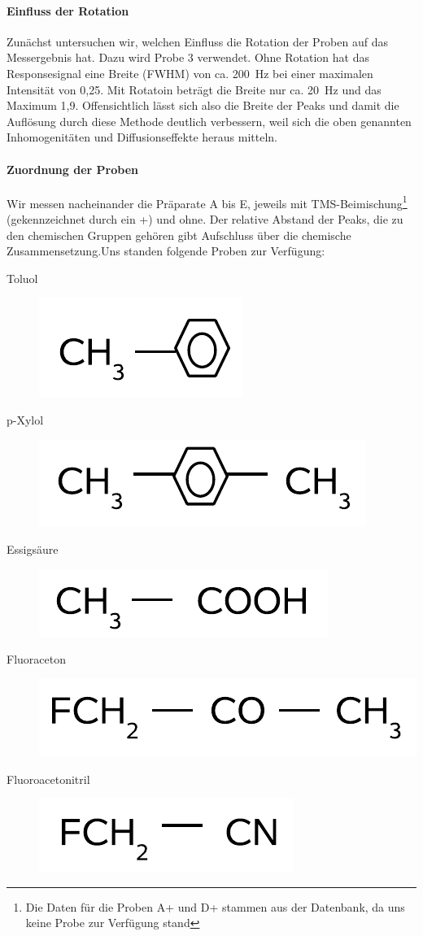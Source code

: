 \documentclass[a4paper]{scrartcl} %
\begin{document}
\paragraph{Einfluss der Rotation}

Zunächst untersuchen wir, welchen Einfluss die Rotation der Proben auf das Messergebnis hat. Dazu wird Probe 3 verwendet. Ohne Rotation hat das Responsesignal eine Breite (FWHM) von ca. \SI{200}{Hz} bei einer maximalen Intensität von 0,25. Mit Rotatoin beträgt die Breite nur ca. \SI{20}{Hz} und das Maximum 1,9. Offensichtlich lässt sich also die Breite der Peaks und damit die Auflösung durch diese Methode deutlich verbessern, weil sich die oben genannten Inhomogenitäten und Diffusionseffekte heraus mitteln.

\paragraph{Zuordnung der Proben}
Wir messen nacheinander die Präparate A bis E, jeweils mit TMS-Beimischung\footnote{Die Daten für die Proben A+ und D+ stammen aus der Datenbank, da uns keine Probe zur Verfügung stand} (gekennzeichnet durch ein +) und ohne. Der relative Abstand der Peaks, die zu den chemischen Gruppen gehören gibt Aufschluss über die chemische Zusammensetzung.Uns standen folgende Proben zur Verfügung:

\begin{description}
	\item[Toluol] \includegraphics[height = 0.6 cm]{./Resources/toluol.png}
	\item[p-Xylol] \includegraphics[height = 0.6 cm]{./Resources/p-xylol.png}
	\item[Essigsäure] \includegraphics[height = 0.6 cm]{./Resources/acetic_acid.png}
	\item[Fluoraceton] \includegraphics[height = 0.6 cm]{./Resources/fluoroacetone.png}
	\item[Fluoroacetonitril] \includegraphics[height = 0.6 cm]{./Resources/fluoroacetonitril.png}
\end{description}
\end{document}
